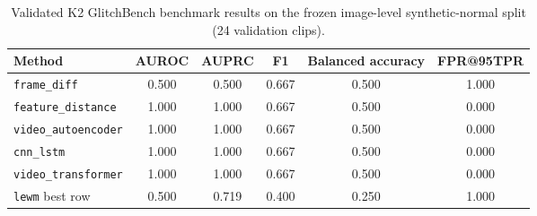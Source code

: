 \begin{table}[t]
\centering
\caption{Validated K2 GlitchBench benchmark results on the frozen image-level synthetic-normal
split (24 validation clips).}
\label{tab:glitchbench-benchmark}
\small
\begin{tabular}{lccccc}
\toprule
Method & AUROC & AUPRC & F1 & Balanced accuracy & FPR@95TPR \\
\midrule
\texttt{frame\_diff} & 0.500 & 0.500 & 0.667 & 0.500 & 1.000 \\
\texttt{feature\_distance} & 1.000 & 1.000 & 0.667 & 0.500 & 0.000 \\
\texttt{video\_autoencoder} & 1.000 & 1.000 & 0.667 & 0.500 & 0.000 \\
\texttt{cnn\_lstm} & 1.000 & 1.000 & 0.667 & 0.500 & 0.000 \\
\texttt{video\_transformer} & 1.000 & 1.000 & 0.667 & 0.500 & 0.000 \\
\texttt{lewm} best row & 0.500 & 0.719 & 0.400 & 0.250 & 1.000 \\
\bottomrule
\end{tabular}
\end{table}
